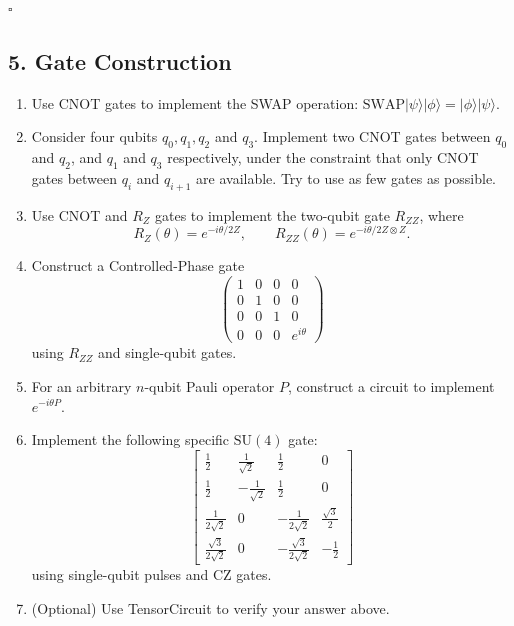 \documentclass{ctexart}
\newcommand{\ket}[1]{|#1\rangle}
\begin{document}
\hfill $\square$

\subsection*{5. Gate Construction}

\begin{enumerate}
    \item[(a)] Use CNOT gates to implement the SWAP operation: $\text{SWAP}\ket{\psi}\ket{\phi} = \ket{\phi}\ket{\psi}$.
    \item[(b)] Consider four qubits $q_0, q_1, q_2$ and $q_3$. Implement two CNOT gates between $q_0$ and $q_2$, and $q_1$ and $q_3$ respectively, under the constraint that only CNOT gates between $q_i$ and $q_{i+1}$ are available. Try to use as few gates as possible.
    \item[(c)] Use CNOT and $R_Z$ gates to implement the two-qubit gate $R_{ZZ}$, where
    \begin{equation*}
        R_Z(\theta) = e^{-i\theta/2 Z}, \qquad R_{ZZ}(\theta) = e^{-i\theta/2 Z\otimes Z}.
    \end{equation*}
    \item[(d)] Construct a Controlled-Phase gate
    \begin{equation*}
        \begin{pmatrix}
            1 & 0 & 0 & 0 \\
            0 & 1 & 0 & 0 \\
            0 & 0 & 1 & 0 \\
            0 & 0 & 0 & e^{i\theta}
        \end{pmatrix}
    \end{equation*}
    using $R_{ZZ}$ and single-qubit gates.
    \item[(e)] For an arbitrary $n$-qubit Pauli operator $P$, construct a circuit to implement $e^{-i\theta P}$.
    \item[(f)] Implement the following specific $\mathrm{SU}(4)$ gate:
    \begin{equation*}
        \begin{bmatrix}
            \frac{1}{2} & \frac{1}{\sqrt{2}} & \frac{1}{2} & 0 \\[6pt]
            \frac{1}{2} & -\frac{1}{\sqrt{2}} & \frac{1}{2} & 0 \\[6pt]
            \frac{1}{2\sqrt{2}} & 0 & -\frac{1}{2\sqrt{2}} & \frac{\sqrt{3}}{2} \\[6pt]
            \frac{\sqrt{3}}{2\sqrt{2}} & 0 & -\frac{\sqrt{3}}{2\sqrt{2}} & -\frac{1}{2}
        \end{bmatrix}
    \end{equation*}
    using single-qubit pulses and CZ gates.
    \item[(g)] (Optional) Use TensorCircuit to verify your answer above.
\end{enumerate}
\end{document}
